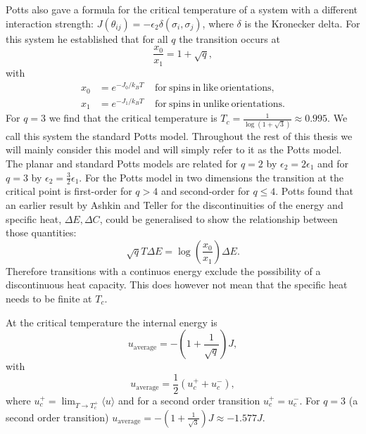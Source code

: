 \documentclass[11pt, a4paper]{report} %
\begin{document}
Potts also gave a formula for the critical temperature of a system with a different interaction strength: \(J(\theta_{ij}) = -\epsilon_2 \delta(\sigma_i, \sigma_j)\), where \(\delta\) is the Kronecker delta.
For this system he established that for all \(q\) the transition occurs at\cite{potts:1952}
\begin{equation}
	\frac{x_0}{x_1} = 1 + \sqrt{q},
\end{equation}
with
\begin{align}
	x_0 &= e^{-J_0 / k_B T} \mathrm{\ \ \ \ \ for\ spins\ in\ like\ orientations,}\\
	x_1 & = e^{-J_1 / k_B T} \mathrm{\ \ \ \ \ for\ spins\ in\ unlike\ orientations}.
\end{align}
For \(q=3\) we find that the critical temperature is \(T_c=\frac{1}{\log(1+\sqrt{3})} \approx 0.995\).\cite{fan:2007}
We call this system the standard Potts model.
Throughout the rest of this thesis we will mainly consider this model and will simply refer to it as the Potts model.
The planar and standard Potts models are related for \(q = 2\) by \(\epsilon_2 = 2 \epsilon_1\) and for \(q=3\) by \(\epsilon_2 = \frac{3}{2} \epsilon_1\).
For the Potts model in two dimensions the transition at the critical point is first-order for \(q > 4\) and second-order for \(q \leq 4\).\cite{wu:1982,baxter:1973}
Potts found that an earlier result by Ashkin and Teller for the discontinuities of the energy and specific heat\cite{ashkin:1943}, \(\Delta E, \Delta C\), could be generalised to show the relationship between those quantities:
\begin{equation}
	\sqrt{q}T \Delta E = \log(\frac{x_0}{x_1}) \Delta E.
\end{equation}
Therefore transitions with a continuos energy exclude the possibility of a discontinuous heat capacity.
This does however not mean that the specific heat needs to be finite at \(T_c\).


At the critical temperature the internal energy is\cite{baxter:1989,binder:1981a}
\begin{equation}
	u_{\mathrm{average}} = -\left(1+\frac{1}{\sqrt{q}}\right)J,
\end{equation}
with
\begin{equation}
	u_{\mathrm{average}} = \frac{1}{2} (u_c^+ + u_c^-),
\end{equation}
where \(u_c^+ = \lim_{T \to T_c^+} \langle u \rangle\) and for a second order transition \(u_c^+ = u_c^-\).
For \(q=3\) (a second order transition) \(u_{\mathrm{average}} = -(1+\frac{1}{\sqrt{3}})J \approx - 1.577 J\).
\end{document}
